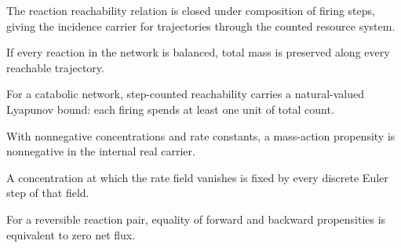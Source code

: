 \begin{theorem}\label{thm:reaction-reachability}\leanok{}
The reaction reachability relation is closed under composition of firing
steps, giving the incidence carrier for trajectories through the counted
resource system.
\end{theorem}

\begin{theorem}\label{thm:reaction-reach-conserves-mass}\leanok{}
If every reaction in the network is balanced, total mass is preserved along
every reachable trajectory.
\end{theorem}

\begin{theorem}\label{thm:reaction-catabolic-descent}\leanok{}
For a catabolic network, step-counted reachability carries a natural-valued
Lyapunov bound: each firing spends at least one unit of total count.
\end{theorem}

\begin{theorem}\label{thm:reaction-propensity-nonnegative}\leanok{}
With nonnegative concentrations and rate constants, a mass-action propensity is
nonnegative in the internal real carrier.
\end{theorem}

\begin{theorem}\label{thm:reaction-mass-action-equilibrium}\leanok{}
A concentration at which the rate field vanishes is fixed by every discrete
Euler step of that field.
\end{theorem}

\begin{theorem}\label{thm:reaction-detailed-balance}\leanok{}
For a reversible reaction pair, equality of forward and backward propensities
is equivalent to zero net flux.
\end{theorem}

